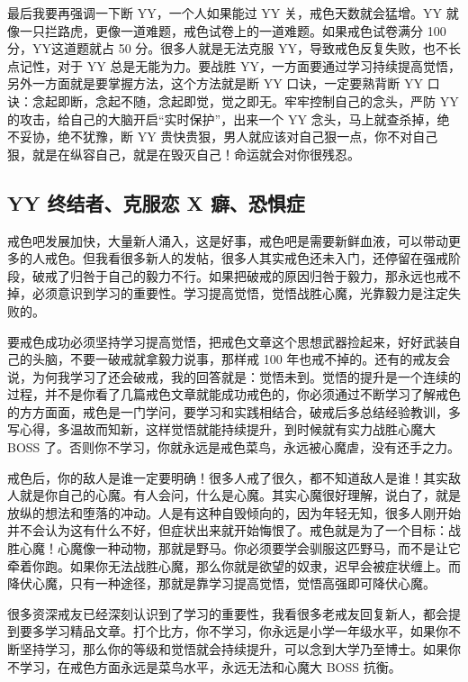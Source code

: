 \documentclass{ctexart}
\begin{document}
最后我要再强调一下断 YY，一个人如果能过 YY 关，戒色天数就会猛增。YY 就像一只拦路虎，更像一道难题，戒色试卷上的一道难题。如果戒色试卷满分 100 分，YY这道题就占 50 分。很多人就是无法克服 YY，导致戒色反复失败，也不长点记性，对于 YY 总是无能为力。要战胜 YY，一方面要通过学习持续提高觉悟，另外一方面就是要掌握方法，这个方法就是断 YY 口诀，一定要熟背断 YY 口诀：念起即断，念起不随，念起即觉，觉之即无。牢牢控制自己的念头，严防 YY 的攻击，给自己的大脑开启“实时保护”，出来一个 YY 念头，马上就查杀掉，绝不妥协，绝不犹豫，断 YY 贵快贵狠，男人就应该对自己狠一点，你不对自己狠，就是在纵容自己，就是在毁灭自己！命运就会对你很残忍。

\subsection{YY 终结者、克服恋 X 癖、恐惧症}

戒色吧发展加快，大量新人涌入，这是好事，戒色吧是需要新鲜血液，可以带动更多的人戒色。但我看很多新人的发帖，很多人其实戒色还未入门，还停留在强戒阶段，破戒了归咎于自己的毅力不行。如果把破戒的原因归咎于毅力，那永远也戒不掉，必须意识到学习的重要性。学习提高觉悟，觉悟战胜心魔，光靠毅力是注定失败的。

要戒色成功必须坚持学习提高觉悟，把戒色文章这个思想武器捡起来，好好武装自己的头脑，不要一破戒就拿毅力说事，那样戒 100 年也戒不掉的。还有的戒友会说，为何我学习了还会破戒，我的回答就是：觉悟未到。觉悟的提升是一个连续的过程，并不是你看了几篇戒色文章就能成功戒色的，你必须通过不断学习了解戒色的方方面面，戒色是一门学问，要学习和实践相结合，破戒后多总结经验教训，多写心得，多温故而知新，这样觉悟就能持续提升，到时候就有实力战胜心魔大 BOSS 了。否则你不学习，你就永远是戒色菜鸟，永远被心魔虐，没有还手之力。

戒色后，你的敌人是谁一定要明确！很多人戒了很久，都不知道敌人是谁！其实敌人就是你自己的心魔。有人会问，什么是心魔。其实心魔很好理解，说白了，就是放纵的想法和堕落的冲动。人是有这种自毁倾向的，因为年轻无知，很多人刚开始并不会认为这有什么不好，但症状出来就开始悔恨了。戒色就是为了一个目标：战胜心魔！心魔像一种动物，那就是野马。你必须要学会驯服这匹野马，而不是让它牵着你跑。如果你无法战胜心魔，那么你就是欲望的奴隶，迟早会被症状缠上。而降伏心魔，只有一种途径，那就是靠学习提高觉悟，觉悟高强即可降伏心魔。

很多资深戒友已经深刻认识到了学习的重要性，我看很多老戒友回复新人，都会提到要多学习精品文章。打个比方，你不学习，你永远是小学一年级水平，如果你不断坚持学习，那么你的等级和觉悟就会持续提升，可以念到大学乃至博士。如果你不学习，在戒色方面永远是菜鸟水平，永远无法和心魔大 BOSS 抗衡。
\end{document}
